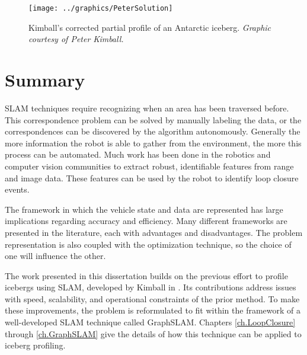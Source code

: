  \begin{figure}[!htb]
   \centering
   \texttt{[image: ../graphics/PeterSolution]} %
   \caption{Kimball's corrected partial profile of an Antarctic iceberg. \emph{Graphic courtesy of Peter Kimball.}}
   \label{fig:KimballSolution}
\end{figure}

\section{Summary}

SLAM techniques require recognizing when an area has been traversed before. This correspondence problem can be solved by manually labeling the data, or the correspondences can be discovered by the algorithm autonomously. Generally the more information the robot is able to gather from the environment, the more this process can be automated. Much work has been done in the robotics and computer vision communities to extract robust, identifiable features from range and image data. These features can be used by the robot to identify loop closure events. 

The framework in which the vehicle state and data are represented has large implications regarding accuracy and efficiency. Many different frameworks are presented in the literature, each with advantages and disadvantages. The problem representation is also coupled with the optimization technique, so the choice of one will influence the other.

The work presented in this dissertation builds on the previous effort to profile icebergs using SLAM, developed by Kimball in \cite{Kimball2011b}. Its contributions address issues with speed, scalability, and operational constraints of the prior method. To make these improvements, the problem is reformulated to fit within the framework of a well-developed SLAM technique called GraphSLAM. Chapters \ref{ch.LoopClosure} through \ref{ch.GraphSLAM} give the details of how this technique can be applied to iceberg profiling.

